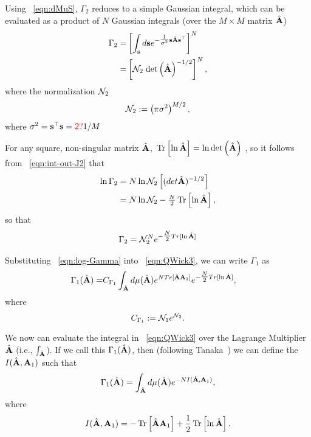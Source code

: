 Using \EQN~\ref{eqn:dMuS}, 
$\Gamma_2$ reduces to a simple Gaussian integral, which can be evaluated as a product of $N$ Gaussian integrals (over the $M\times M$ matrix $\hat{\mathbf{A}}$)
\begin{align}
\label{eqn:int-out-J2}
\Gamma_2 
   =& \left[\int_{{\mathbf{s}}} d\mathbf{s}e^{-\tfrac{1}{\sigma^{2}} \mathbf{s}\hat{\mathbf{A}}\mathbf{s}^{\top} }\right]^{N} \\
   =& \left[\mathcal{N}_{2}\;\mbox{}{\text{det}}\left(\hat{\mathbf{A}}\right)^{-1/2}\right]^{N}  ,
\end{align}
where the normalization $\mathcal{N}_2$
\begin{align}
\label{eqn:norm_2}
\mathcal{N}_2 := \left(\pi\sigma^{2}\right)^{M/2}  ,
\end{align}
where $\sigma^{2}=\mathbf{s}^{\top}\mathbf{s}={\color{red}\sf{2?}}1/M$

For any square, non-singular matrix $\hat{\mathbf{A}}$,  $ \mbox{}\operatorname{Tr}\left[\ln\hat{\mathbf{A}}\right]=\ln \mbox{}{\text{det}}\left(\hat{\mathbf{A}}\right)$ , so
it follows from \EQN~\ref{eqn:int-out-J2} that
\begin{align}
\nonumber
\ln\Gamma_2 
   &=N\ln\NORM_2\left[( det \AHAT)^{-1/2} \right]  \\   %
&= N\ln\NORM_2 -\tfrac{N}{2}\Trace{ \ln\AHAT }  ,
\end{align}
so that
\begin{align}
\label{eqn:log-Gamma}
\Gamma_2 = \mathcal{N}_{2}^{N} e^{ -\tfrac{N}{2} Tr[ \ln\hat{\mathbf{A}} ] } 
\end{align}

Substituting
\EQN~\ref{eqn:log-Gamma}
into \EQN~\ref{eqn:QWick3},
we can write $\Gamma_1$ as
\begin{eqnarray}
  \label{eqn:gamma1}
\Gamma_1(\hat{\mathbf{A}})  =& C_{\Gamma_1}\int_{\hat{\mathbf{A}}} d\mu(\hat{\mathbf{A}})   e^{ N Tr[ \hat{\mathbf{A}}\mathbf{A}_{1} ] }  e^{ -\tfrac{N}{2} Tr[ \ln\hat{\mathbf{A}} ] }  ,
\end{eqnarray}
where
\begin{equation}
    C_{\Gamma_1}:=\mathcal{N}_1 e^{\mathcal{N}_2}  .
\end{equation}

We now can evaluate the integral in \EQN~\ref{eqn:QWick3} over the Lagrange Multiplier $\hat{\mathbf{A}}$ (i.e., $\int_{\hat{\mathbf{A}}} $). 
If we call this $\Gamma_1(\hat{\mathbf{A}})$,
then (following Tanaka~\cite{Tanaka2008}) we can define the \emph{\RateFunction} $I(\hat{\mathbf{A}},\mathbf{A}_{1})$ such that
\begin{align}
\label{eqn:LambdaA}
\Gamma_1(\hat{\mathbf{A}})=\int_{\hat{\mathbf{A}}}  d\mu(\hat{\mathbf{A}}) e^{-NI(\hat{\mathbf{A}},\mathbf{A}_{1})}  ,
\end{align}
where
\begin{align}
\label{eqn:IAA}
I(\hat{\mathbf{A}},\mathbf{A}_{1}) = -\mbox{}\operatorname{Tr}\left[ \hat{\mathbf{A}}\mathbf{A}_{1}\right] + \frac{1}{2}\mbox{}\operatorname{Tr}\left[ \ln\hat{\mathbf{A}} \right]  .
\end{align}


